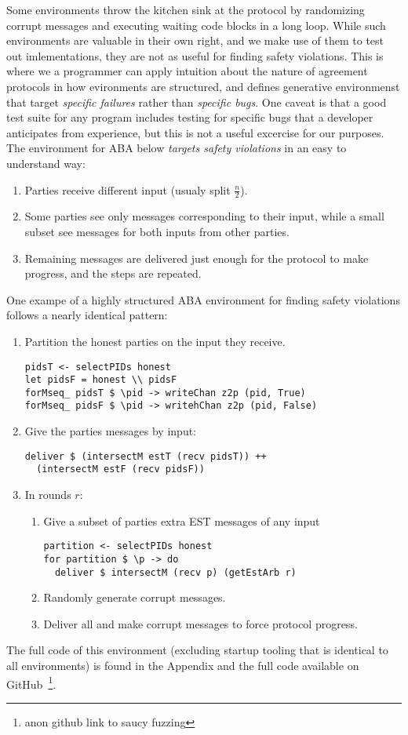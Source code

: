 Some environments throw the kitchen sink at the protocol by randomizing corrupt messages and executing waiting code blocks in a long loop. While such environments are valuable in their own right, and we make use of them to test out imlementations, they are not as useful for finding safety violations. 
This is where we a programmer can apply intuition about the nature of agreement protocols in how evironments are structured, and defines generative environmenst that target \emph{specific failures} rather than \emph{specific bugs}.
One caveat is that a good test suite for any program includes testing for specific bugs that a developer anticipates from experience, but this is not a useful excercise for our purposes.
The environment for ABA below \emph{targets safety violations} in an easy to understand way:
\begin{enumerate}
\item Parties receive different input (usualy split $\frac{n}{2}$).
\item Some parties see only messages corresponding to their input, while a small subset see messages for both inputs from other parties.
\item Remaining messages are delivered just enough for the protocol to make progress, and the steps are repeated.
\end{enumerate}
One exampe of a highly structured ABA environment for finding safety violations follows a nearly identical pattern:
\begin{enumerate}
\item Partition the honest parties on the input they receive.
\begin{lstlisting}
pidsT <- selectPIDs honest
let pidsF = honest \\ pidsF
forMseq_ pidsT $ \pid -> writeChan z2p (pid, True)
forMseq_ pidsF $ \pid -> writehChan z2p (pid, False)
\end{lstlisting}
\item Give the parties  messages by input:
\begin{lstlisting}
deliver $ (intersectM estT (recv pidsT)) ++ 
  (intersectM estF (recv pidsF))
\end{lstlisting}
\item In rounds $r$:
    \begin{enumerate}
    \item Give a subset of parties extra EST messages of any input
\begin{lstlisting}
partition <- selectPIDs honest
for partition $ \p -> do
  deliver $ intersectM (recv p) (getEstArb r)
\end{lstlisting}
        \item Randomly generate corrupt  messages.
        \item Deliver all  and make corrupt  messages to force protocol progress.
    \end{enumerate}
\end{enumerate}
The full code of this environment (excluding startup tooling that is identical to all environments) is found in the Appendix and the full code available on GitHub~\footnote{anon github link to saucy fuzzing}.

